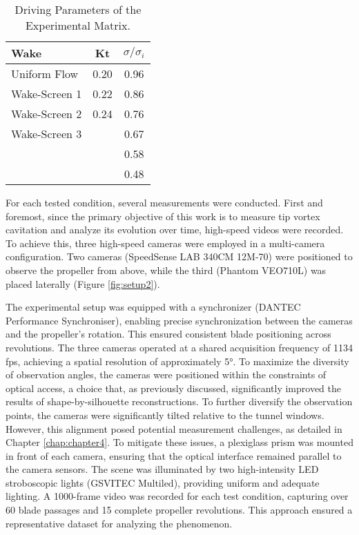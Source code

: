 \begin{table}[h!]
    \centering
    \begin{tabular}{lcc}
    \toprule
    Wake & Kt & \(\sigma / \sigma_i\) \\ 
    \midrule
    Uniform Flow   & 0.20 & 0.96  \\
    Wake-Screen 1  & 0.22 & 0.86  \\
    Wake-Screen 2  & 0.24 & 0.76  \\
    Wake-Screen 3  &    & 0.67  \\
    &    & 0.58  \\
    &    & 0.48  \\
    \bottomrule
    \end{tabular}
    \caption{Driving Parameters of the Experimental Matrix.}
    \label{tab:testedConditions}
\end{table}

For each tested condition, several measurements were conducted.
First and foremost, since the primary objective of this work is to measure tip vortex cavitation and analyze its evolution over time, high-speed videos were recorded.
To achieve this, three high-speed cameras were employed in a multi-camera configuration. Two cameras (SpeedSense LAB 340CM 12M-70) were positioned to observe the propeller from above, while the third (Phantom VEO710L) was placed laterally (Figure \ref{fig:setup2}).

The experimental setup was equipped with a synchronizer (DANTEC Performance Synchroniser), enabling precise synchronization between the cameras and the propeller's rotation. This ensured consistent blade positioning across revolutions. 
The three cameras operated at a shared acquisition frequency of 1134 fps, achieving a spatial resolution of approximately 5°. 
To maximize the diversity of observation angles, the cameras were positioned within the constraints of optical access, a choice that, as previously discussed, significantly improved the results of shape-by-silhouette reconstructions.
To further diversify the observation points, the cameras were significantly tilted relative to the tunnel windows. However, this alignment posed potential measurement challenges, as detailed in Chapter \ref{chap:chapter4}. To mitigate these issues, a plexiglass prism was mounted in front of each camera, ensuring that the optical interface remained parallel to the camera sensors.
The scene was illuminated by two high-intensity LED stroboscopic lights (GSVITEC Multiled), providing uniform and adequate lighting. 
A 1000-frame video was recorded for each test condition, capturing over 60 blade passages and 15 complete propeller revolutions. This approach ensured a representative dataset for analyzing the phenomenon.


